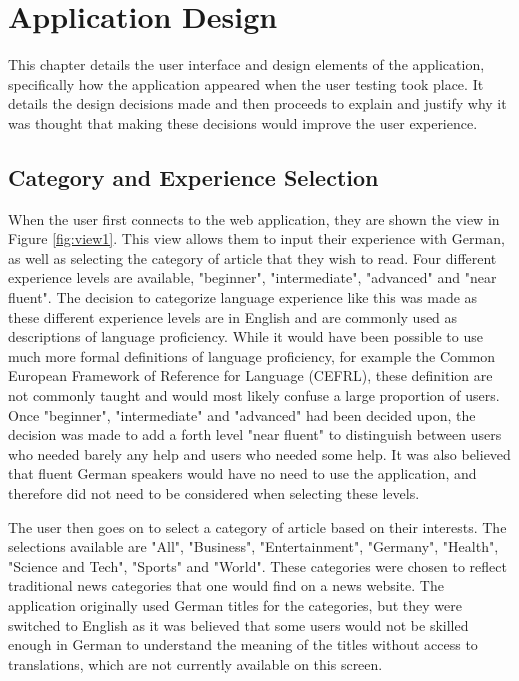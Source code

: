 \chapter{Application Design}

This chapter details the user interface and design elements of the application, specifically how the application appeared when the user testing took place. It details the design decisions made and then proceeds to explain and justify why it was thought that making these decisions would improve the user experience.

\section{Category and Experience Selection}

When the user first connects to the web application, they are shown the view in Figure \ref{fig:view1}. This view allows them to input their experience with German, as well as selecting the category of article that they wish to read. Four different experience levels are available, "beginner", "intermediate", "advanced" and "near fluent". The decision to categorize language experience like this was made as these different experience levels are in English and are commonly used as descriptions of language proficiency. While it would have been possible to use much more formal definitions of language proficiency, for example the Common European Framework of Reference for Language (CEFRL), these definition are not commonly taught and would most likely confuse a large proportion of users. Once "beginner", "intermediate" and "advanced" had been decided upon, the decision was made to add a forth level "near fluent" to distinguish between users who needed barely any help and users who needed some help. It was also believed that fluent German speakers would have no need to use the application, and therefore did not need to be considered when selecting these levels.



The user then goes on to select a category of article based on their interests. The selections available are "All", "Business", "Entertainment", "Germany", "Health", "Science and Tech", "Sports" and "World". These categories were chosen to reflect traditional news categories that one would find on a news website. The application originally used German titles for the categories, but they were switched to English as it was believed that some users would not be skilled enough in German to understand the meaning of the titles without access to translations, which are not currently available on this screen. 

